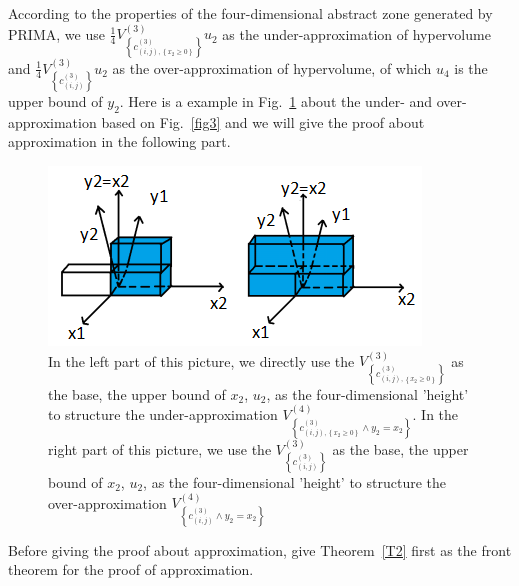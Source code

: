 \documentclass[runningheads]{llncs}
\begin{document}
According to the properties of the four-dimensional abstract zone generated by PRIMA, we use $\frac{1}{4}V^{(3)}_{\left \{c^{(3)}_{\left ( i,j\right ),\left \{x_{2}\geq 0\right \}}\right \}}u_{2}$ as the under-approximation of hypervolume and $\frac{1}{4}V^{(3)}_{\left \{c^{(3)}_{( i,j)}\right \}}u_{2}$ as the over-approximation of hypervolume, of which $u_{4}$ is the upper bound of $y_{2}$. Here is a example in Fig.~\ref{fig4} about the under- and over- approximation based on Fig.~\ref{fig3} and we will give the proof about approximation in the following part.

\begin{figure}
\includegraphics[width=\textwidth]{../Fig/FigR2_2.png}
\caption{In the left part of this picture, we directly use the $V^{(3)}_{\left \{c^{(3)}_{\left ( i,j\right ),\left \{x_{2}\geq 0\right \}}\right \}}$ as the base, the upper bound of $x_{2}$, $u_{2}$, as the four-dimensional 'height' to structure the under-approximation $V^{(4)}_{ \left \{ c^{(3)}_{\left ( i,j\right ),\left \{x_{2}\geq 0\right \}}\wedge y_{2}=x_{2}\right \} }$. In the right part of this picture, we use the $V^{(3)}_{\left \{c^{(3)}_{\left ( i,j\right )}\right \}}$ as the base, the upper bound of $x_{2}$, $u_{2}$, as the four-dimensional 'height' to structure the over-approximation $V^{(4)}_{ \left \{ c^{(3)}_{\left ( i,j\right )}\wedge y_{2}=x_{2}\right \} }$} \label{fig4}
\end{figure}

Before giving the proof about approximation, give Theorem~\ref{T2} first as the front theorem for the proof of approximation.
\end{document}
